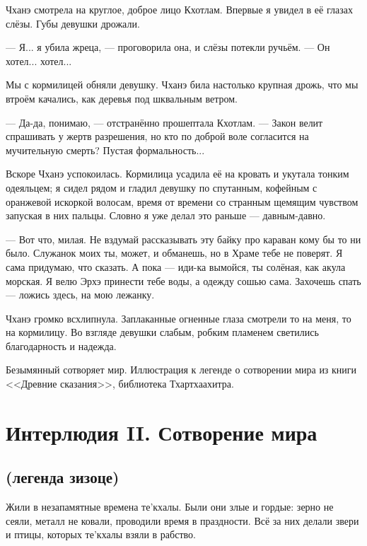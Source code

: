Чханэ смотрела на круглое, доброе лицо Кхотлам.
Впервые я увидел в её глазах слёзы.
Губы девушки дрожали.

--- Я... я убила жреца, --- проговорила она, и слёзы потекли ручьём.
--- Он хотел... хотел...

Мы с кормилицей обняли девушку.
Чханэ била настолько крупная дрожь, что мы втроём качались, как деревья под шквальным ветром.

--- Да-да, понимаю, --- отстранённо прошептала Кхотлам.
--- Закон велит спрашивать у жертв разрешения, но кто по доброй воле согласится на мучительную смерть?
Пустая формальность...

Вскоре Чханэ успокоилась.
Кормилица усадила её на кровать и укутала тонким одеяльцем;
я сидел рядом и гладил девушку по спутанным, кофейным с оранжевой искоркой волосам, время от времени со странным щемящим чувством запуская в них пальцы.
Словно я уже делал это раньше --- давным-давно.

--- Вот что, милая.
Не вздумай рассказывать эту байку про караван кому бы то ни было.
Служанок моих ты, может, и обманешь, но в Храме тебе не поверят.
Я сама придумаю, что сказать.
А пока --- иди-ка вымойся, ты солёная, как акула морская.
Я велю Эрхэ принести тебе воды, а одежду сошью сама.
Захочешь спать --- ложись здесь, на мою лежанку.

Чханэ громко всхлипнула.
Заплаканные огненные глаза смотрели то на меня, то на кормилицу.
Во взгляде девушки слабым, робким пламенем светились благодарность и надежда.


\newpage
\thispagestyle{plain}

Безымянный сотворяет мир.
Иллюстрация к легенде о сотворении мира из книги <<Древние сказания>>, библиотека Тхартхаахитра.
\newpage

\chapter*{Интерлюдия II. Сотворение мира}


\section*{(легенда зизоце)}

Жили в незапамятные времена те'кхалы\footnotemark.
Были они злые и гордые: зерно не сеяли, металл не ковали, проводили время в праздности.
Всё за них делали звери и птицы, которых те'кхалы взяли в рабство.

